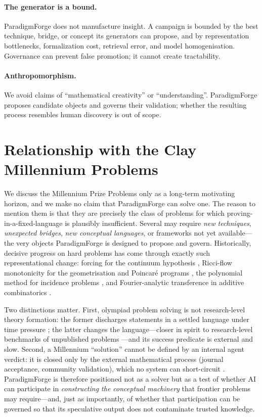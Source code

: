 \documentclass[11pt]{article}
\theoremstyle{definition}
\theoremstyle{remark}
\newcommand{\PF}{ParadigmForge}
\begin{document}
\paragraph{The generator is a bound.} \PF{} does not manufacture insight. A campaign is bounded by
the best technique, bridge, or concept its generators can propose, and by representation bottlenecks,
formalization cost, retrieval error, and model homogenisation. Governance can prevent false
promotion; it cannot create tractability.

\paragraph{Anthropomorphism.} We avoid claims of ``mathematical creativity'' or ``understanding''.
\PF{} proposes candidate objects and governs their validation; whether the resulting process
resembles human discovery is out of scope.

\section{Relationship with the Clay Millennium Problems}
\label{sec:millennium}

We discuss the Millennium Prize Problems only as a long-term motivating horizon, and we make no claim
that \PF{} can solve one. The reason to mention them is that they are precisely the class of problems
for which proving-in-a-fixed-language is plausibly insufficient. Several may require
\emph{new techniques}, \emph{unexpected bridges}, \emph{new conceptual languages}, or frameworks not
yet available---the very objects \PF{} is designed to propose and govern. Historically, decisive
progress on hard problems has come through exactly such representational change: forcing for the
continuum hypothesis \citep{cohen1963}, Ricci-flow monotonicity for the geometrisation and Poincar\'e
programs \citep{hamilton1982,perelman2002}, the polynomial method for incidence problems
\citep{guthkatz2015}, and Fourier-analytic transference in additive combinatorics
\citep{greentao2008}.

Two distinctions matter. First, olympiad problem solving is not research-level theory formation: the
former discharges statements in a settled language under time pressure
\citep{trinh2024alphageom,chervonyi2025alphageom2}; the latter changes the language---closer in
spirit to research-level benchmarks of unpublished problems \citep{abouzaid2026firstproof}---and its
success predicate is external and slow. Second, a Millennium ``solution'' cannot be defined by an internal
agent verdict: it is closed only by the external mathematical process (journal acceptance, community
validation), which no system can short-circuit \citep{lucius2026bourbaki}. \PF{} is therefore
positioned not as a solver but as a test of whether AI can participate in \emph{constructing the
conceptual machinery} that frontier problems may require---and, just as importantly, of whether that
participation can be governed so that its speculative output does not contaminate trusted knowledge.
\end{document}

